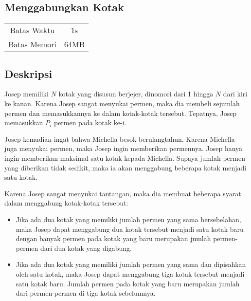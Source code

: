 \documentclass{article}
\begin{document}
\begin{center}
    \section*{Menggabungkan Kotak} %

    \begin{tabular}{ | c c | }
        \hline
        Batas Waktu  & 1s \\    %
        Batas Memori & 64MB \\  %
        \hline
    \end{tabular}
\end{center}

\subsection*{Deskripsi}



Josep memiliki $N$ kotak yang disusun berjejer, dinomori dari 1 hingga $N$ dari kiri ke kanan. Karena Josep sangat menyukai permen, maka dia membeli sejumlah permen dan memasukkannya ke dalam kotak-kotak tersebut. Tepatnya, Josep memasukkan $P_i$ permen pada kotak ke-i.

Josep kemudian ingat bahwa Michella besok berulangtahun. Karena Michella juga menyukai permen, maka Josep ingin memberikan permennya. Josep hanya ingin memberikan maksimal satu kotak kepada Michella. Supaya jumlah permen yang diberikan tidak sedikit, maka ia akan menggabung beberapa kotak menjadi satu kotak.

Karena Josep sangat menyukai tantangan, maka dia membuat beberapa syarat dalam menggabung kotak-kotak tersebut:

\begin{itemize}
    \item Jika ada dua kotak yang memiliki jumlah permen yang sama bersebelahan, maka Josep dapat menggabung dua kotak tersebut menjadi satu kotak baru dengan banyak permen pada kotak yang baru merupakan jumlah permen-permen dari dua kotak yang digabung.
    \item Jika ada dua kotak yang memiliki jumlah permen yang sama dan dipisahkan oleh satu kotak, maka Josep dapat menggabung tiga kotak tersebut menjadi satu kotak baru. Jumlah permen pada kotak yang baru merupakan jumlah dari permen-permen di tiga kotak sebelumnya.
\end{itemize}
\end{document}
